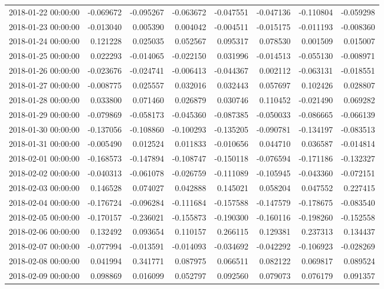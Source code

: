 \begin{tabular}{lrrrrrrr}
2018-01-22 00:00:00 & -0.069672 & -0.095267 & -0.063672 & -0.047551 & -0.047136 & -0.110804 & -0.059298 \\
2018-01-23 00:00:00 & -0.013040 & 0.005390 & 0.004042 & -0.004511 & -0.015175 & -0.011193 & -0.008360 \\
2018-01-24 00:00:00 & 0.121228 & 0.025035 & 0.052567 & 0.095317 & 0.078530 & 0.001509 & 0.015007 \\
2018-01-25 00:00:00 & 0.022293 & -0.014065 & -0.022150 & 0.031996 & -0.014513 & -0.055130 & -0.008971 \\
2018-01-26 00:00:00 & -0.023676 & -0.024741 & -0.006413 & -0.044367 & 0.002112 & -0.063131 & -0.018551 \\
2018-01-27 00:00:00 & -0.008775 & 0.025557 & 0.032016 & 0.032443 & 0.057697 & 0.102426 & 0.028807 \\
2018-01-28 00:00:00 & 0.033800 & 0.071460 & 0.026879 & 0.030746 & 0.110452 & -0.021490 & 0.069282 \\
2018-01-29 00:00:00 & -0.079869 & -0.058173 & -0.045360 & -0.087385 & -0.050033 & -0.086665 & -0.066139 \\
2018-01-30 00:00:00 & -0.137056 & -0.108860 & -0.100293 & -0.135205 & -0.090781 & -0.134197 & -0.083513 \\
2018-01-31 00:00:00 & -0.005490 & 0.012524 & 0.011833 & -0.010656 & 0.044710 & 0.036587 & -0.014814 \\
2018-02-01 00:00:00 & -0.168573 & -0.147894 & -0.108747 & -0.150118 & -0.076594 & -0.171186 & -0.132327 \\
2018-02-02 00:00:00 & -0.040313 & -0.061078 & -0.026759 & -0.111089 & -0.105945 & -0.043360 & -0.072151 \\
2018-02-03 00:00:00 & 0.146528 & 0.074027 & 0.042888 & 0.145021 & 0.058204 & 0.047552 & 0.227415 \\
2018-02-04 00:00:00 & -0.176724 & -0.096284 & -0.111684 & -0.157588 & -0.147579 & -0.178675 & -0.083540 \\
2018-02-05 00:00:00 & -0.170157 & -0.236021 & -0.155873 & -0.190300 & -0.160116 & -0.198260 & -0.152558 \\
2018-02-06 00:00:00 & 0.132492 & 0.093654 & 0.110157 & 0.266115 & 0.129381 & 0.237313 & 0.134437 \\
2018-02-07 00:00:00 & -0.077994 & -0.013591 & -0.014093 & -0.034692 & -0.042292 & -0.106923 & -0.028269 \\
2018-02-08 00:00:00 & 0.041994 & 0.341771 & 0.087975 & 0.066511 & 0.082122 & 0.069817 & 0.089524 \\
2018-02-09 00:00:00 & 0.098869 & 0.016099 & 0.052797 & 0.092560 & 0.079073 & 0.076179 & 0.091357 \\

\end{tabular}
